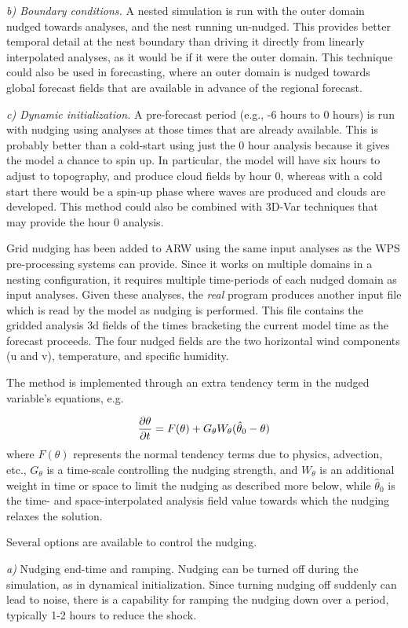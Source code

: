 {\it b) Boundary conditions.} A nested simulation is run with the outer domain nudged towards analyses, and the nest running un-nudged. This provides better temporal detail at the nest boundary than driving it directly from linearly interpolated analyses, as it would be if it were the outer domain. This technique could also be used in forecasting, where an outer domain is nudged towards global forecast fields that are available in advance of the regional forecast.

{\it c) Dynamic initialization.} A pre-forecast period (e.g., -6 hours to 0 hours) is run with nudging using analyses at those times that are already available. This is probably better than a cold-start using just the 0 hour analysis because it gives the model a chance to spin up. In particular, the model will have six hours to adjust to topography, and produce cloud fields by hour 0, whereas with a cold start there would be a spin-up phase where waves are produced and clouds are developed. This method could also be combined with 3D-Var techniques that may provide the hour 0 analysis.

Grid nudging has been added to ARW using the same input analyses as the WPS pre-processing systems can provide. Since it works on multiple domains in a nesting configuration, it requires multiple time-periods of each nudged domain as input analyses. Given these analyses, the {\it real} program produces another input file which is read by the model as nudging is performed. This file contains the gridded analysis 3d fields of the times bracketing the current model time as the forecast proceeds. The four nudged fields are the two horizontal wind components (u and v), temperature, and specific humidity. 

The method is implemented through an extra tendency term in the nudged variable's equations, e.g.

$$ {\partial \theta \over \partial t} = F(\theta) + G_{\theta} W_{\theta} ( \hat \theta_0 - \theta)  $$
where $F(\theta)$ represents the normal tendency terms due to physics, advection, etc., $G_{\theta}$ is a time-scale controlling the nudging strength, and $W_{\theta}$ is an additional weight in time or space to limit the nudging as described more below, while $\hat \theta_0$ is the time- and space-interpolated analysis field value towards which the nudging relaxes the solution.

Several options are available to control the nudging.

{\it a)} Nudging end-time and ramping. Nudging can be turned off during the simulation, as in dynamical initialization. Since turning nudging off suddenly can lead to noise, there is a capability for ramping the nudging down over a period, typically 1-2 hours to reduce the shock.

